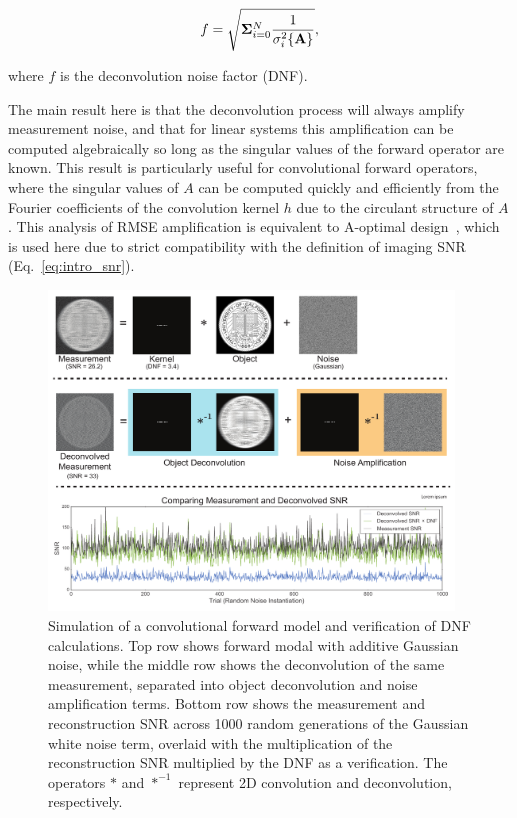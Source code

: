 \begin{equation}\label{eq:intro_dnf}
    f = \sqrt{\mathbf{\Sigma}_{i=0}^N{\frac{1}{\sigma_i^2\{\mathbf{A}\}}}},
\end{equation}

\noindent where $f$ is the deconvolution noise factor (DNF).

The main result here is that the deconvolution process will always amplify measurement noise, and that for linear systems this amplification can be computed algebraically so long as the singular values of the forward operator are known. This result is particularly useful for convolutional forward operators, where the singular values of $A$ can be computed quickly and efficiently from the Fourier coefficients of the convolution kernel $h$ due to the circulant structure of $A$. This analysis of RMSE amplification is equivalent to A-optimal design~\cite{chernoff1953locally}, which is used here due to strict compatibility with the definition of imaging SNR (Eq.~\ref{eq:intro_snr}).

\begin{figure}[tbh]
\centering
\includegraphics[width=0.96\textwidth]{figures/fig_intro_dnf.pdf}
\caption{\label{fig:intro:dnf} Simulation of a convolutional forward model and verification of DNF calculations. Top row shows forward modal with additive Gaussian noise, while the middle row shows the deconvolution of the same measurement, separated into object deconvolution and noise amplification terms. Bottom row shows the measurement and reconstruction SNR across 1000 random generations of the Gaussian white noise term, overlaid with the multiplication of the reconstruction SNR multiplied by the DNF as a verification. The operators $*$ and $*^{-1}$ represent 2D convolution and deconvolution, respectively.}
\end{figure}

